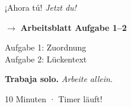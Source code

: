 \documentclass[aspectratio=169, 11pt]{beamer}
\newcommand{\seriftext}[1]{{\fontfamily{ppl}\selectfont #1}}
\newcommand{\es}[1]{\seriftext{\textbf{#1}}}
\newcommand{\de}[1]{\textit{\textcolor{mittelgrau}{#1}}}
\newcommand{\abmark}[1]{{\Large$\rightarrow$ \textbf{Arbeitsblatt Aufgabe #1}}}
\newcommand{\zeit}[1]{{\small\textcolor{mittelgrau}{#1}}}
\begin{document}
\begin{frame}{¡Ahora tú! \de{Jetzt du!}}
    \vspace{1cm}

    \begin{center}
        \abmark{1--2}

        \vspace{0.8cm}

        {\large Aufgabe 1: Zuordnung}\\
        {\large Aufgabe 2: Lückentext}

        \vspace{0.8cm}

        \es{Trabaja solo.} \de{Arbeite allein.}

        \vspace{0.5cm}

        \zeit{10 Minuten · Timer läuft!}
    \end{center}
\end{frame}

\end{document}

